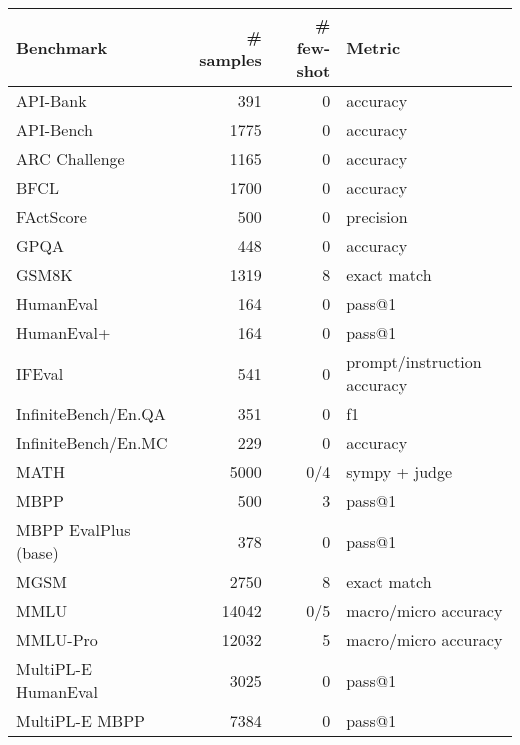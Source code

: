 \begin{table}
    \center
    \setlength{\tabcolsep}{3pt}
    \begin{tabular}{lrrl}
        \toprule
        \textbf{Benchmark} & \textbf{\# samples} & \textbf{\# few-shot} & \textbf{Metric} \\
        \midrule
        API-Bank~\citep{li2023api} & 391 & 0 & accuracy \\
        API-Bench~\citep{patil2023gorilla} & 1775 & 0 & accuracy \\
        ARC Challenge \citep{clark2018think} & 1165 & 0 & accuracy  \\
        BFCL~\citep{berkeley-function-calling-leaderboard} & 1700 & 0 & accuracy \\
        FActScore \citep{min2023factscore} & 500 & 0 & precision \\
        GPQA \citep{rein2023gpqagraduatelevelgoogleproofqa} & 448 & 0 & accuracy  \\
        GSM8K \citep{cobbe2021training} & 1319 & 8 & exact match  \\
        HumanEval \citep{chen2021evaluating} & 164 & 0 & pass@1  \\
        HumanEval+~\citep{liu2024your} & 164 & 0 & pass@1 \\
        IFEval \citep{zhou2023instruction} & 541 & 0 & prompt/instruction accuracy  \\
        InfiniteBench/En.QA \citep{zhang2024infty} & 351 & 0 & f1  \\
        InfiniteBench/En.MC \citep{zhang2024infty} & 229 & 0 & accuracy  \\
        MATH \citep{hendrycks2021measuring} & 5000 & 0/4 & sympy + judge  \\
        MBPP \citep{austin2021program} & 500 & 3 & pass@1 \\
        MBPP EvalPlus (base) \citep{liu2024your} & 378 & 0 & pass@1 \\
        MGSM \citep{shi2022languagemodelsmultilingualchainofthought} & 2750 & 8 & exact match  \\
        MMLU \citep{hendrycks2021mmlu} & 14042 & 0/5 & macro/micro accuracy  \\
        MMLU-Pro \citep{wang2024mmlu} & 12032 & 5 & macro/micro accuracy  \\
        MultiPL-E HumanEval ~\citep{cassano2022multiple} & 3025 & 0 & pass@1 \\
        MultiPL-E MBPP ~\citep{cassano2022multiple} & 7384 & 0 & pass@1  \\

\end{tabular}
\end{table}
